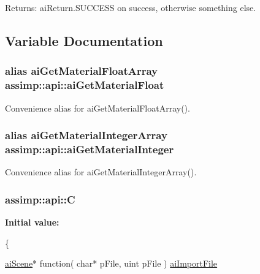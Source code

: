 Returns\+: {\ttfamily ai\+Return.\+S\+U\+C\+C\+E\+S\+S} on success, otherwise something else. 

\subsection{Variable Documentation}
\hypertarget{namespaceassimp_1_1api_a2c26953d3d9bd2ac94f7cc060f2bd859}{
\subsubsection[{ai\+Get\+Material\+Float}]{\setlength{\rightskip}{0pt plus 5cm}alias ai\+Get\+Material\+Float\+Array assimp\+::api\+::ai\+Get\+Material\+Float}}\label{namespaceassimp_1_1api_a2c26953d3d9bd2ac94f7cc060f2bd859}
Convenience alias for {\ttfamily ai\+Get\+Material\+Float\+Array()}. \hypertarget{namespaceassimp_1_1api_aa216865c75da2c28fc3d77471b00c3ea}{
\subsubsection[{ai\+Get\+Material\+Integer}]{\setlength{\rightskip}{0pt plus 5cm}alias ai\+Get\+Material\+Integer\+Array assimp\+::api\+::ai\+Get\+Material\+Integer}}\label{namespaceassimp_1_1api_aa216865c75da2c28fc3d77471b00c3ea}
Convenience alias for {\ttfamily ai\+Get\+Material\+Integer\+Array()}. \hypertarget{namespaceassimp_1_1api_a6a69c3a6cfdb38c9939fabe50d23b987}{
\subsubsection[{C}]{\setlength{\rightskip}{0pt plus 5cm}assimp\+::api\+::\+C}}\label{namespaceassimp_1_1api_a6a69c3a6cfdb38c9939fabe50d23b987}
{\bfseries Initial value\+:}
\begin{DoxyCode}
\{
   
   \hyperlink{structai_scene}{aiScene}* \textcolor{keyword}{function}( \textcolor{keywordtype}{char}* pFile, uint pFile ) \hyperlink{_assimp_8cpp_a991846be600bc8a54f6878e5bca96907}{aiImportFile}
\end{DoxyCode}
